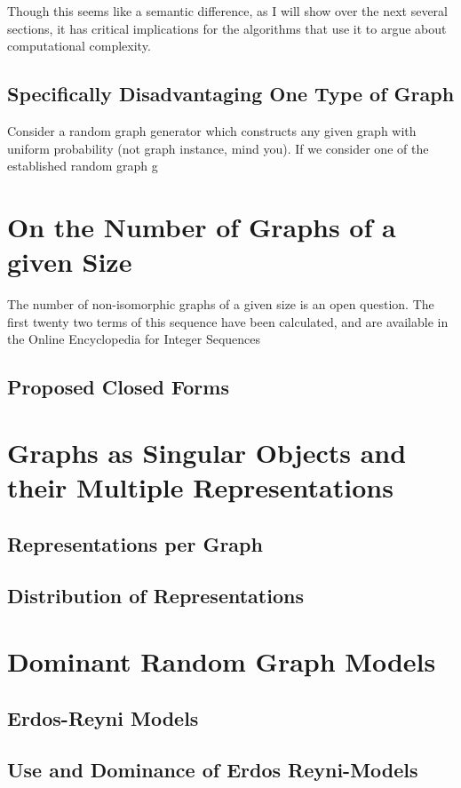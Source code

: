 \documentclass[11pt,a4paper]{report}
\begin{document}
Though this seems like a semantic difference, as I will show over the next several sections, it has critical implications for the algorithms that use it to argue about computational complexity.

\subsection{Specifically Disadvantaging One Type of Graph}

Consider a random graph generator which constructs any given graph with uniform probability (not graph instance, mind you).
If we consider one of the established random graph g

\section{On the Number of Graphs of a given Size}
The number of non-isomorphic graphs of a given size is an open question.
The first twenty two terms of this sequence have been calculated, and are available in the Online Encyclopedia for Integer Sequences\cite{OEIS}
\subsection{Proposed Closed Forms}

\section{Graphs as Singular Objects and their Multiple Representations}
\subsection{Representations per Graph}
\subsection{Distribution of Representations}

\section{Dominant Random Graph Models}
\subsection{Erdos-Reyni Models}
\subsection{Use and Dominance of Erdos Reyni-Models}
\end{document}
